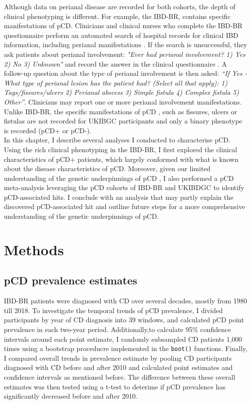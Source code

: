 Although data on perianal disease are recorded for both cohorts, the depth of clinical phenotyping is different. For example, the IBD-BR, contains specific manifestations of pCD. Clinicians and clinical nurses who complete the IBD-BR questionnaire perform an automated search of hospital records for clinical IBD information, including perianal manifestations \cite{ibdbr-protocol-v8}.  If the search is unsuccessful, they ask patients about perianal involvement: \textit{"Ever had perianal involvement? 1) Yes 2) No 3) Unknown"}  and record the answer in the clinical questionnaire \cite{ibdbr-questionnaire-v7}. A follow-up question about the type of perianal involvement is then asked: \textit{“If Yes - What type of perianal lesion has the patient had? (Select all that apply): 1) Tags/fissures/ulcers 2) Perianal abscess 3) Simple fistula 4) Complex fistula 5) Other”}. Clinicians may report one or more perianal involvement manifestations.  Unlike IBD-BR, the specific manifestations of pCD , such as fissures, ulcers or fistulas are not recorded for UKIBGC participants and only a binary phenotype is recorded (pCD+ or pCD-). \\

In this chapter, I describe several analyses I conducted to characterise pCD. Using the rich clinical phenotyping in the IBD-BR, I first explored the clinical characteristics of pCD+ patients, which largely conformed with what is known about the disease characteristics of pCD. Moreover, given our limited understanding of the genetic underpinnings of pCD \cite{Eglinton2012-ls,Latiano2009-bu,Tozer2009-mp,Akhlaghpour2023-jw,Kaur2016-bs}, I also performed a pCD meta-analysis leveraging the pCD cohorts of IBD-BR and UKIBDGC to identify pCD-associated hits. I conclude with an analysis that may partly explain the discovered pCD-associated hit and outline future steps for a more comprehensive understanding of the genetic underpinnings of pCD.
\section{Methods}
\subsection{pCD prevalence estimates}
IBD-BR patients were diagnosed with CD over several decades, mostly from 1980 till 2018. To investigate the temporal trends of pCD prevalence, I divided participants by year of CD diagnosis into 39 windows, and calculated pCD point prevalence in each two-year period. Additionally,to calculate 95\% confidence intervals around each point estimate, I randomly subsampled CD patients 1,000 times using a bootstrap proceducre implemented in the \Verb+boot()+ functions. Finally, I compared overall trends in prevalence estimate by pooling CD participants diagnosed with CD before and after 2010 and calculated point estimates and confidence intervals as mentioned before. The difference between these overall estimates was then tested using a t-test to deterime if pCD prevalence has significantly decreased before and after 2010.
